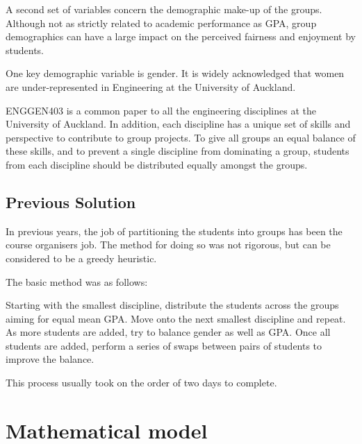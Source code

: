 \documentclass[12pt]{ORSNZ}
\begin{document}
A second set of variables concern the demographic make-up of the groups. Although not as strictly related to academic performance as GPA, group demographics can have a large impact on the perceived fairness and enjoyment by students.

One key demographic variable is gender. It is widely acknowledged that women are under-represented in Engineering at the University of Auckland.

ENGGEN403 is a common paper to all the engineering disciplines at the University of Auckland. In addition, each discipline has a unique set of skills and perspective to contribute to group projects. To give all groups an equal balance of these skills, and to prevent a single discipline from dominating a group, students from each discipline should be distributed equally amongst the groups.

\subsection{Previous Solution}
In previous years, the job of partitioning the students into groups has been the course organisers job. The method for doing so was not rigorous, but can be considered to be a greedy heuristic. 

The basic method was as follows:

Starting with the smallest discipline, distribute the students across the groups aiming for equal mean GPA. Move onto the next smallest discipline and repeat. As more students are added, try to balance gender as well as GPA. Once all students are added, perform a series of swaps between pairs of students to improve the balance.

This process usually took on the order of two days to complete.

\section{Mathematical model}
\end{document}
